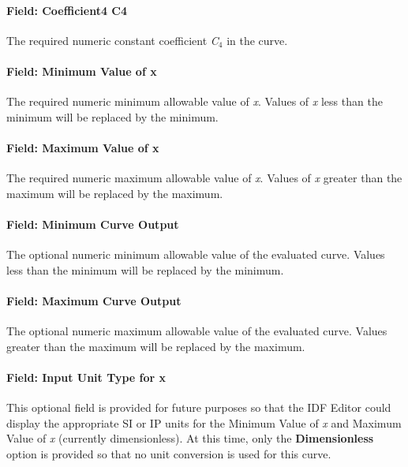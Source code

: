 \paragraph{Field: Coefficient4 C4}\label{field-coefficient4-c4}

The required numeric constant coefficient \emph{C\(_{4}\)} in the curve.

\paragraph{Field: Minimum Value of x}\label{field-minimum-value-of-x-12}

The required numeric minimum allowable value of \emph{x}. Values of \emph{x} less than the minimum will be replaced by the minimum.

\paragraph{Field: Maximum Value of x}\label{field-maximum-value-of-x-13}

The required numeric maximum allowable value of \emph{x}. Values of \emph{x} greater than the maximum will be replaced by the maximum.

\paragraph{Field: Minimum Curve Output}\label{field-minimum-curve-output-12}

The optional numeric minimum allowable value of the evaluated curve. Values less than the minimum will be replaced by the minimum.

\paragraph{Field: Maximum Curve Output}\label{field-maximum-curve-output-11}

The optional numeric maximum allowable value of the evaluated curve. Values greater than the maximum will be replaced by the maximum.

\paragraph{Field: Input Unit Type for x}\label{field-input-unit-type-for-x-12}

This optional field is provided for future purposes so that the IDF Editor could display the appropriate SI or IP units for the Minimum Value of \emph{x} and Maximum Value of \emph{x} (currently dimensionless). At this time, only the \textbf{Dimensionless} option is provided so that no unit conversion is used for this curve.

